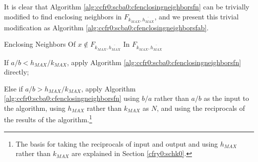 It is clear that Algorithm \ref{alg:ccfr0:scba0:cfenclosingneighborsfn}
can be trivially modified to find enclosing neighbors
in $F_{k_{MAX},\overline{h_{MAX}}}$, and we present this
trivial modification as Algorithm
\ref{alg:ccfr0:scba0:cfenclosingneighborsfab}.

\begin{vworkalgorithmstatementpar}{Enclosing Neighbors Of 
                                   \mbox{\boldmath $x \notin F_{k_{MAX},\overline{h_{MAX}}}$} 
                                   In \mbox{\boldmath $F_{k_{MAX},\overline{h_{MAX}}}$}}
\label{alg:ccfr0:scba0:cfenclosingneighborsfab}
\begin{alglvl0}
\item If $a/b < h_{MAX}/k_{MAX}$, apply Algorithm 
      \ref{alg:ccfr0:scba0:cfenclosingneighborsfn} directly;

\item Else if $a/b > h_{MAX}/k_{MAX}$, apply Algorithm
      \ref{alg:ccfr0:scba0:cfenclosingneighborsfn} using $b/a$ rather
	  than $a/b$ as the input to the algorithm, using $h_{MAX}$ 
	  rather than $k_{MAX}$ as $N$, and
	  using the reciprocals of the results of the algorithm.\footnote{The
	  basis for taking the reciprocals of input and output and
	  using $h_{MAX}$ rather than $k_{MAX}$ are explained
	  in \cfryzeroxrefcomma{}Section \ref{cfry0:schk0}.}

\end{alglvl0}
\end{vworkalgorithmstatementpar}

